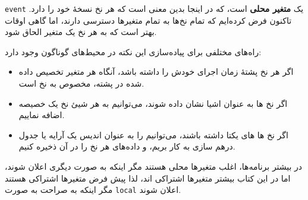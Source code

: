 \documentclass{book}
\newcommand{\clearemptydoublepage}{\newpage\cleardoublepage}
\begin{document}
    {\tt event}
    یک \textbf{متغیر محلی} است، که در اینجا بدین معنی است که هر نخ نسخهٔ خود را دارد.
    تاکنون فرض کرده‌ایم که تمام نخ‌ها به تمام متغیرها دسترسی دارند، اما گاهی اوقات بهتر است که به هر نخ یک متغیر الحاق شود.

    راه‌های مختلفی برای پیاده‌سازی این نکته در محیط‌های گوناگون وجود دارد:
    
\begin{itemize}

\item 
    اگر هر نخ پشتهٔ زمان اجرای خودش را داشته باشد، آنگاه هر متغیر تخصیص داده شده در پشته، 
    مخصوص به نخ است.

\item 
    اگر نخ ها به عنوان اشیا نشان داده شوند، می‌توانیم به هر شیئ نخ یک خصیصه اضافه نماییم.

\item 
    اگر نخ ها های یکتا داشته باشند، می‌توانیم  را به عنوان اندیس یک آرایه یا جدول درهم سازی به کار بریم، 
    و داده‌های هر نخ را در آن ذخیره کنیم.

\end{itemize}

    در بیشتر برنامه‌ها، اغلب متغیرها محلی هستند مگر اینکه به صورت دیگری اعلان شوند، 
    اما در این کتاب بیشتر متغیرها اشتراکی اند، لذا پیش فرض متغیرها اشتراکی هستند مگر اینکه به صراحت به صورت 
    {\tt local} اعلان شوند.


\clearemptydoublepage
\end{document}
